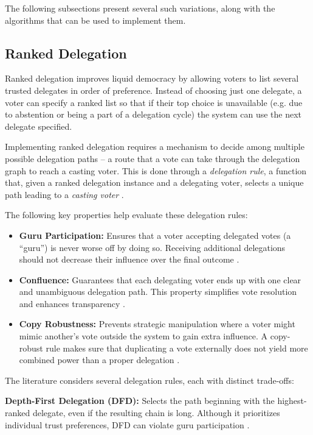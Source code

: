 The following subsections present several such variations, along with the algorithms that can be used to implement them.
\subsection*{Ranked Delegation}
Ranked delegation improves liquid democracy by allowing voters to list several trusted delegates in order of preference. Instead of choosing just one delegate, a voter can specify a ranked list so that if their top choice is unavailable (e.g. due to abstention or being a part of a delegation cycle) the system can use the next delegate specified.

Implementing ranked delegation requires a mechanism to decide among multiple possible delegation paths -- a route that a vote can take through the delegation graph to reach a casting voter.
This is done through a \textit{delegation rule}, a function that, given a ranked delegation instance and a delegating voter, selects a unique path leading to a \textit{casting voter} \citep{brill_liquid_2022}.

The following key properties help evaluate these delegation rules:

\begin{itemize}
  \item \textbf{Guru Participation:} Ensures that a voter accepting delegated votes (a ``guru'') is never worse off by doing so. Receiving additional delegations should not decrease their influence over the final outcome \citep{kotsialou_riley_2020}. 
  \item \textbf{Confluence:} Guarantees that each delegating voter ends up with one clear and unambiguous delegation path. This property simplifies vote resolution and enhances transparency \citep{brill_liquid_2022}. 
  \item \textbf{Copy Robustness:} Prevents strategic manipulation where a voter might mimic another's vote outside the system to gain extra influence. A copy-robust rule makes sure that duplicating a vote externally does not yield more combined power than a proper delegation \citep{brill_liquid_2022,behrens_2015}. 
\end{itemize}

The literature considers several delegation rules, each with distinct trade-offs:

\textbf{Depth-First Delegation (DFD):} Selects the path beginning with the highest-ranked delegate, even if the resulting chain is long. Although it prioritizes individual trust preferences, DFD can violate guru participation \citep{kotsialou_riley_2020}.

